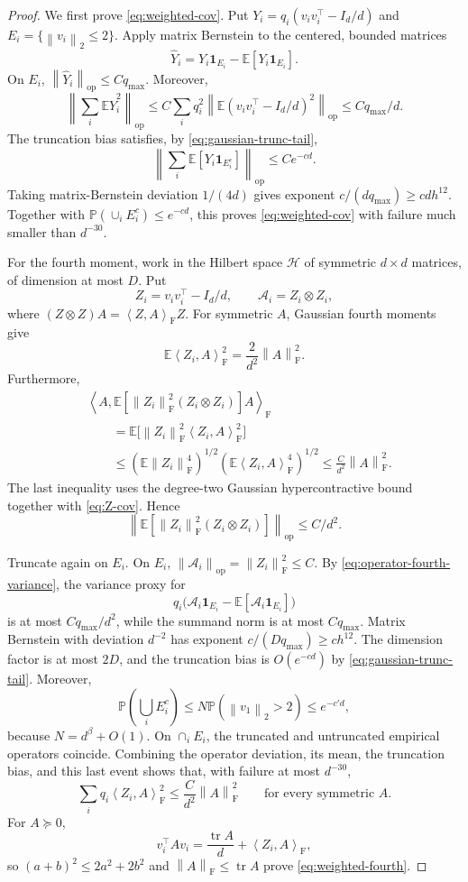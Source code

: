 \documentclass[11pt]{article}
\theoremstyle{remark}
\newcommand{\E}{\mathbb E}
\newcommand{\Pp}{\mathbb P}
\newcommand{\ip}[2]{\left\langle #1,#2\right\rangle}
\newcommand{\norm}[1]{\left\lVert #1\right\rVert}
\newcommand{\op}{\mathrm{op}}
\newcommand{\F}{\mathrm{F}}
\newcommand{\1}{\mathbf 1}
\newcommand{\tr}{\operatorname{tr}}
\begin{document}
\begin{proof}
We first prove \eqref{eq:weighted-cov}.  Put
$Y_i=q_i(v_iv_i^\top-I_d/d)$ and
$E_i=\{\norm{v_i}_2\leq2\}$.  Apply matrix Bernstein to the centered,
bounded matrices
\[
 \widehat Y_i=Y_i\1_{E_i}-\E[Y_i\1_{E_i}].
\]
On $E_i$, $\norm{\widehat Y_i}_{\op}\leq Cq_{\max}$.  Moreover,
\[
 \left\|\sum_i\E\widehat Y_i^2\right\|_{\op}
 \leq C\sum_iq_i^2
 \left\|\E(v_iv_i^\top-I_d/d)^2\right\|_{\op}
 \leq Cq_{\max}/d.
\]
The truncation bias satisfies, by \eqref{eq:gaussian-trunc-tail},
\[
 \left\|\sum_i\E[Y_i\1_{E_i^c}]\right\|_{\op}
 \leq Ce^{-cd}.
\]
Taking matrix-Bernstein deviation $1/(4d)$ gives exponent
$c/(dq_{\max})\geq cdh^{12}$.  Together with
$\Pp(\cup_iE_i^c)\leq e^{-cd}$, this proves
\eqref{eq:weighted-cov} with failure much smaller than $d^{-30}$.

For the fourth moment, work in the Hilbert space
$\mathcal H$ of symmetric $d\times d$ matrices, of dimension at most
$D$.  Put
\[
 Z_i=v_iv_i^\top-I_d/d,
 \qquad
 \mathcal A_i=Z_i\otimes Z_i,
\]
where $(Z\otimes Z)A=\ip{Z}{A}_{\F}Z$.  For symmetric $A$,
Gaussian fourth moments give
\begin{equation}
 \E\ip{Z_i}{A}_{\F}^2=\frac2{d^2}\norm A_{\F}^2.
 \label{eq:Z-cov}
\end{equation}
Furthermore,
\begin{align*}
 &\ip{A}{\E[\norm{Z_i}_{\F}^2(Z_i\otimes Z_i)]A}_{\F}\\
 &\qquad=\E\bigl[\norm{Z_i}_{\F}^2\ip{Z_i}{A}_{\F}^2\bigr]\\
 &\qquad\leq
 (\E\norm{Z_i}_{\F}^4)^{1/2}
 (\E\ip{Z_i}{A}_{\F}^4)^{1/2}
 \leq\frac{C}{d^2}\norm A_{\F}^2.
\end{align*}
The last inequality uses the degree-two Gaussian hypercontractive
bound together with \eqref{eq:Z-cov}.  Hence
\begin{equation}
 \left\|\E[\norm{Z_i}_{\F}^2(Z_i\otimes Z_i)]\right\|_{\op}
 \leq C/d^2.
 \label{eq:operator-fourth-variance}
\end{equation}

Truncate again on $E_i$.  On $E_i$,
$\norm{\mathcal A_i}_{\op}=\norm{Z_i}_{\F}^2\leq C$.  By
\eqref{eq:operator-fourth-variance}, the variance proxy for
\[
 q_i\bigl(\mathcal A_i\1_{E_i}-
 \E[\mathcal A_i\1_{E_i}]\bigr)
\]
is at most $Cq_{\max}/d^2$, while the summand norm is at most
$Cq_{\max}$.  Matrix Bernstein with deviation $d^{-2}$ has exponent
$c/(Dq_{\max})\geq ch^{12}$.  The dimension factor is at most $2D$, and the truncation bias is
$O(e^{-cd})$ by \eqref{eq:gaussian-trunc-tail}.  Moreover,
\[
 \Pp\!\left(\bigcup_iE_i^c\right)
 \leq N\Pp(\norm{v_1}_2>2)\leq e^{-c'd},
\]
because $N=d^\beta+O(1)$.  On $\cap_iE_i$, the truncated and
untruncated empirical operators coincide.  Combining the operator
deviation, its mean, the truncation bias, and this last event shows
that, with failure at most $d^{-30}$,
\[
 \sum_iq_i\ip{Z_i}{A}_{\F}^2
 \leq\frac{C}{d^2}\norm A_{\F}^2
 \qquad\text{for every symmetric }A.
\]
For $A\succeq0$,
\[
 v_i^\top Av_i=\frac{\tr A}{d}+\ip{Z_i}{A}_{\F},
\]
so $(a+b)^2\leq2a^2+2b^2$ and
$\norm A_{\F}\leq\tr A$ prove \eqref{eq:weighted-fourth}.


\end{proof}
\end{document}
